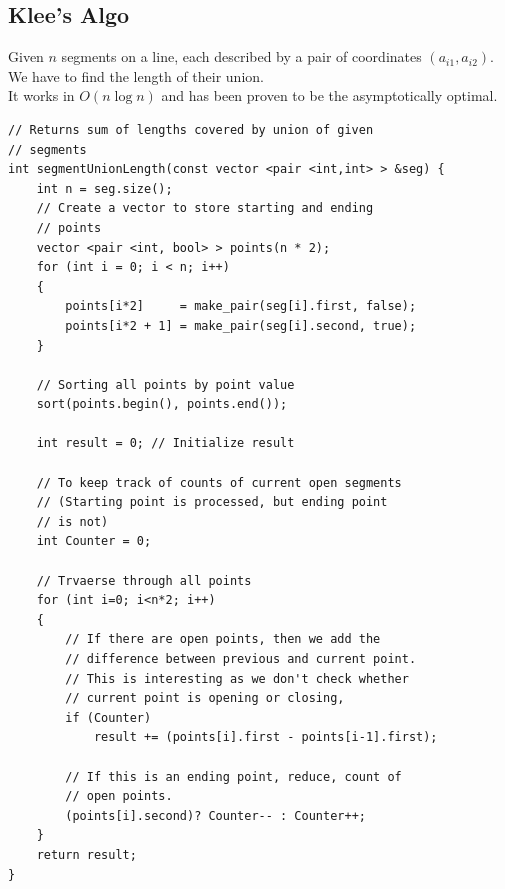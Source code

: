 \documentclass[8pt, a4paper, oneside, twocolumn]{extarticle}
\begin{document}
\subsection{Klee's Algo}
Given $n$ segments on a line, each described by a pair of coordinates $(a_{i1}, a_{i2})$. We have to find the length of their union.
\\It works in $O(n\log n)$ and has been proven to be the asymptotically optimal.
\begin{verbatim}
// Returns sum of lengths covered by union of given 
// segments 
int segmentUnionLength(const vector <pair <int,int> > &seg) {
    int n = seg.size(); 
    // Create a vector to store starting and ending 
    // points 
    vector <pair <int, bool> > points(n * 2); 
    for (int i = 0; i < n; i++) 
    { 
        points[i*2]     = make_pair(seg[i].first, false); 
        points[i*2 + 1] = make_pair(seg[i].second, true); 
    } 
  
    // Sorting all points by point value 
    sort(points.begin(), points.end()); 
  
    int result = 0; // Initialize result 
  
    // To keep track of counts of current open segments 
    // (Starting point is processed, but ending point 
    // is not) 
    int Counter = 0; 
  
    // Trvaerse through all points 
    for (int i=0; i<n*2; i++) 
    { 
        // If there are open points, then we add the 
        // difference between previous and current point. 
        // This is interesting as we don't check whether 
        // current point is opening or closing, 
        if (Counter) 
            result += (points[i].first - points[i-1].first); 
  
        // If this is an ending point, reduce, count of 
        // open points. 
        (points[i].second)? Counter-- : Counter++; 
    } 
    return result; 
} 
\end{verbatim}
\end{document}
